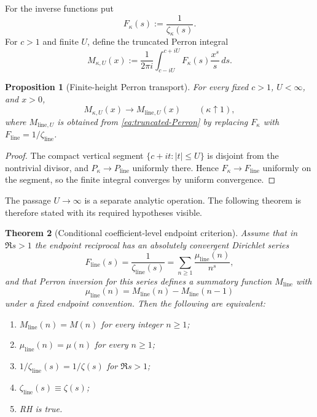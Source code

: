 \documentclass[11pt,reqno]{amsart}
\newtheorem{theorem}{Theorem}[section]
\newtheorem{proposition}[theorem]{Proposition}
\theoremstyle{definition}
\theoremstyle{remark}
\newcommand{\linez}{\mathrm{line}}
\begin{document}
For the inverse functions put
\begin{equation}\label{eq:Fkappa}
 F_\kappa(s):=\frac1{\zeta_\kappa(s)}.
\end{equation}
For $c>1$ and finite $U$, define the truncated Perron integral
\begin{equation}\label{eq:truncated-Perron}
 M_{\kappa,U}(x)
 :=\frac1{2\pi i}\int_{c-iU}^{c+iU}
 F_\kappa(s)\frac{x^s}{s}\,ds.
\end{equation}

\begin{proposition}[Finite-height Perron transport]\label{prop:finite-Perron}
For every fixed $c>1$, $U<\infty$, and $x>0$,
\begin{equation}
 M_{\kappa,U}(x)\longrightarrow M_{\linez,U}(x)
 \qquad(\kappa\uparrow1),
\end{equation}
where $M_{\linez,U}$ is obtained from \eqref{eq:truncated-Perron} by replacing $F_\kappa$ with $F_{\linez}=1/\zeta_{\linez}$.
\end{proposition}

\begin{proof}
The compact vertical segment $\{c+it:|t|\le U\}$ is disjoint from the nontrivial divisor, and $P_\kappa\to P_{\linez}$ uniformly there.  Hence $F_\kappa\to F_{\linez}$ uniformly on the segment, so the finite integral converges by uniform convergence.
\end{proof}

The passage $U\to\infty$ is a separate analytic operation.  The following theorem is therefore stated with its required hypotheses visible.

\begin{theorem}[Conditional coefficient-level endpoint criterion]\label{thm:coefficient-criterion}
Assume that in $\Re s>1$ the endpoint reciprocal has an absolutely convergent Dirichlet series
\begin{equation}\label{eq:line-Dirichlet}
 F_{\linez}(s)=\frac1{\zeta_{\linez}(s)}
 =\sum_{n\ge1}\frac{\mu_{\linez}(n)}{n^s},
\end{equation}
and that Perron inversion for this series defines a summatory function $M_{\linez}$ with
\begin{equation}\label{eq:line-increments}
 \mu_{\linez}(n)=M_{\linez}(n)-M_{\linez}(n-1)
\end{equation}
under a fixed endpoint convention.  Then the following are equivalent:
\begin{enumerate}[label=\textup{(\roman*)}]
\item $M_{\linez}(n)=M(n)$ for every integer $n\ge1$;
\item $\mu_{\linez}(n)=\mu(n)$ for every $n\ge1$;
\item $1/\zeta_{\linez}(s)=1/\zeta(s)$ for $\Re s>1$;
\item $\zeta_{\linez}(s)\equiv\zeta(s)$;
\item RH is true.
\end{enumerate}
\end{theorem}
\end{document}
